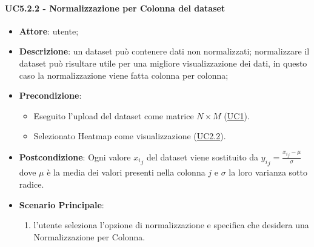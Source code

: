    \paragraph{UC5.2.2 - Normalizzazione per Colonna del dataset}
    \label{uc5.2.2}
    \begin{itemize}
    \item \textbf{Attore}: utente;
    \item \textbf{Descrizione}: un dataset può contenere dati non normalizzati; normalizzare il dataset può risultare utile per una migliore visualizzazione dei dati, in questo caso la normalizzazione viene fatta colonna per colonna;
    \item \textbf{Precondizione}: 
    \begin{itemize}
        \item Eseguito l'upload del dataset come matrice $N\times M$ (\hyperref[uc1]{UC1}).
        \item Selezionato Heatmap come visualizzazione (\hyperref[uc2.2]{UC2.2}).
    \end{itemize}  
    \item \textbf{Postcondizione}: Ogni valore ${x_i}_j$ del dataset viene sostituito da $ {y_i}_j = \frac{{x_i}_j - \mu}{\sigma}$ dove $\mu$ è la media dei valori presenti nella colonna $j$ e $\sigma$ la loro varianza sotto radice.
    \item \textbf{Scenario Principale}: 
    \begin{enumerate}
        \item l'utente seleziona l'opzione di normalizzazione e specifica che desidera una Normalizzazione per Colonna. 
    \end{enumerate}  
    \end{itemize}
    
